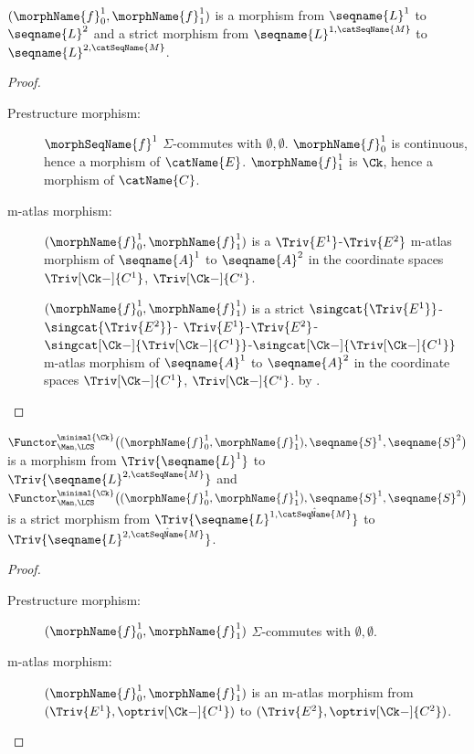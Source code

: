 \documentclass{article}
\begin{document}
\begin{theorem}
$(\morphName{f}^1_0, \morphName{f}^1_1)$ is a morphism from
$\seqname{L}^1$ to $\seqname{L}^2$ and a strict morphism from
$\seqname{L}^{1,\catSeqName{M}}$ to $\seqname{L}^{2,\catSeqName{M}}$.

\begin{proof}
\leavevmode
\begin{description}
\item[Prestructure morphism:]
$\morphSeqName{f}^1$ $\Sigma$-commutes with $\emptyset,\emptyset$.
$\morphName{f}^1_0$ is continuous, hence a morphism of $\catName{E}$.
$\morphName{f}^1_1$ is $\Ck$, hence a morphism of $\catName{C}$.

\item[m-atlas morphism:]
$(\morphName{f}^1_0, \morphName{f}^1_1)$ is a $\Triv{E^1}$-$\Triv{E^2}$
m-atlas morphism of $\seqname{A}^1$ to $\seqname{A}^2$ in the coordinate
spaces $\Triv[\Ck-]{C^1}$, $\Triv[\Ck-]{C^i}$.

$(\morphName{f}^1_0, \morphName{f}^1_1)$ is a strict
$\singcat{\Triv{E^1}}$-$\singcat{\Triv{E^2}}$-%
$\Triv{E^1}$-$\Triv{E^2}$-%
$\singcat[\Ck-]{\Triv[\Ck-]{C^1}}$-$\singcat[\Ck-]{\Triv[\Ck-]{C^1}}$
m-atlas morphism of $\seqname{A}^1$ to $\seqname{A}^2$ in the coordinate
spaces $\Triv[\Ck-]{C^1}$, $\Triv[\Ck-]{C^i}$. by
.
\end{description}
\end{proof}

$
\Functor^{\minimal{\Ck}}_{\Man,\LCS}
  \bigl (
    (\morphName{f}^1_0, \morphName{f}^1_1), \seqname{S}^1, \seqname{S}^2
  \bigr )
$
is a morphism from $\Triv{\seqname{L}^1}$ to
$\Triv{\seqname{L}^{2,\catSeqName{M}}}$ and \\
$
\Functor^{\minimal{\Ck}}_{\Man,\LCS}
  \bigl (
    (\morphName{f}^1_0, \morphName{f}^1_1), \seqname{S}^1, \seqname{S}^2
  \bigr )
$
is a strict morphism from
$\Triv{\seqname{L}^{1,\hat{\catSeqName{M}}}}$ to
$\Triv{\seqname{L}^{2,\hat{\catSeqName{M}}}}$.

\begin{proof}
\leavevmode
\begin{description}
\item[Prestructure morphism:]
$(\morphName{f}^1_0, \morphName{f}^1_1)$ $\Sigma$-commutes with $\emptyset,\emptyset$.

\item[m-atlas morphism:]
$(\morphName{f}^1_0, \morphName{f}^1_1)$ is an m-atlas morphism from
$(\Triv{E^1}, \optriv[\Ck-]{C^1})$ to
$(\Triv{E^2}, \optriv[\Ck-]{C^2})$.
\end{description}
\end{proof}


\end{theorem}
\end{document}
